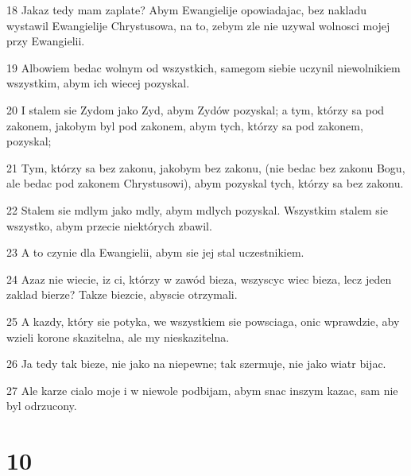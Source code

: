 \par 18 Jakaz tedy mam zaplate? Abym Ewangielije opowiadajac, bez nakladu wystawil Ewangielije Chrystusowa, na to, zebym zle nie uzywal wolnosci mojej przy Ewangielii.
\par 19 Albowiem bedac wolnym od wszystkich, samegom siebie uczynil niewolnikiem wszystkim, abym ich wiecej pozyskal.
\par 20 I stalem sie Zydom jako Zyd, abym Zydów pozyskal; a tym, którzy sa pod zakonem, jakobym byl pod zakonem, abym tych, którzy sa pod zakonem, pozyskal;
\par 21 Tym, którzy sa bez zakonu, jakobym bez zakonu, (nie bedac bez zakonu Bogu, ale bedac pod zakonem Chrystusowi), abym pozyskal tych, którzy sa bez zakonu.
\par 22 Stalem sie mdlym jako mdly, abym mdlych pozyskal. Wszystkim stalem sie wszystko, abym przecie niektórych zbawil.
\par 23 A to czynie dla Ewangielii, abym sie jej stal uczestnikiem.
\par 24 Azaz nie wiecie, iz ci, którzy w zawód bieza, wszyscyc wiec bieza, lecz jeden zaklad bierze? Takze biezcie, abyscie otrzymali.
\par 25 A kazdy, który sie potyka, we wszystkiem sie powsciaga, onic wprawdzie, aby wzieli korone skazitelna, ale my nieskazitelna.
\par 26 Ja tedy tak bieze, nie jako na niepewne; tak szermuje, nie jako wiatr bijac.
\par 27 Ale karze cialo moje i w niewole podbijam, abym snac inszym kazac, sam nie byl odrzucony.

\chapter{10}

